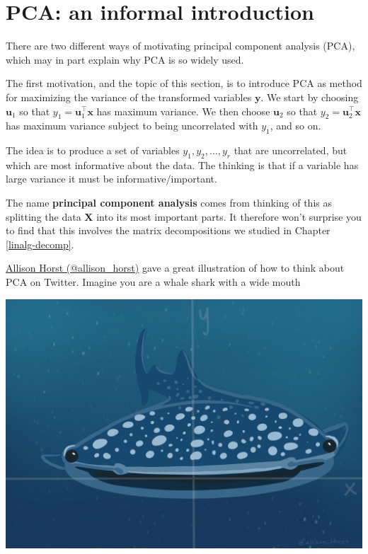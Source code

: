 \documentclass[]{book}
\theoremstyle{definition}
\theoremstyle{definition}
\theoremstyle{definition}
\theoremstyle{remark}
\begin{document}
\hypertarget{pca-an-informal-introduction}{%
\section{PCA: an informal introduction}\label{pca-an-informal-introduction}}

There are two different ways of motivating
principal component analysis (PCA), which may in part explain why PCA is so widely used.

The first motivation, and the topic of this section, is to introduce PCA as method for maximizing the variance of the transformed variables \(\mathbf y\). We start by choosing \(\mathbf u_1\) so that \(y_1=\mathbf u_1^\top \mathbf x\) has maximum variance. We then choose \(\mathbf u_2\) so that \(y_2=\mathbf u_2^\top \mathbf x\) has maximum variance subject to being uncorrelated with \(y_1\), and so on.

The idea is to produce a set of variables \(y_1, y_2, \ldots, y_r\) that are uncorrelated, but which are most informative about the data. The thinking is that if a variable has large variance it must be informative/important.

The name \textbf{principal component analysis} comes from thinking of this as splitting the data \(\mathbf X\) into its most important parts. It therefore won't surprise you to find that this involves the matrix decompositions we studied in Chapter \ref{linalg-decomp}.

\href{https://twitter.com/allison_horst/status/1288904459490213888?lang=en}{Allison Horst (@allison\_horst)} gave a great illustration of how to think about PCA on Twitter. Imagine you are a whale shark with a wide mouth

\includegraphics{figs/WideMouthShark1.png}
\end{document}
